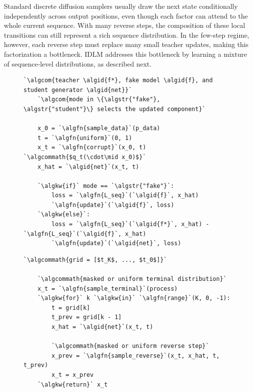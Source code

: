     Standard discrete diffusion samplers usually draw the next state
    conditionally independently across output positions, even though each
    factor can attend to the whole current sequence. With many reverse steps,
    the composition of these local transitions can still represent a rich
    sequence distribution. In the few-step regime, however, each reverse step
    must replace many small teacher updates, making this factorization a
    bottleneck.
    IDLM addresses this bottleneck by learning a mixture of sequence-level
    distributions, as described next.

\begin{figure}[!t]
\centering
\begin{minipage}[t]{0.49\linewidth}
\begin{lstlisting}[language=IDLMPseudocode, escapechar=`, basicstyle=\ttfamily\scriptsize, breaklines=true, gobble=4]
    `\algcom{teacher \algid{f*}, fake model \algid{f}, and student generator \algid{net}}`
    `\algcom{mode in \{\algstr{"fake"}, \algstr{"student"}\} selects the updated component}`

    x_0 = `\algfn{sample_data}`(p_data)
    t = `\algfn{uniform}`(0, 1)
    x_t = `\algfn{corrupt}`(x_0, t)  `\algcommath{$q_t(\cdot\mid x_0)$}`
    x_hat = `\algid{net}`(x_t, t)

    `\algkw{if}` mode == `\algstr{"fake"}`:
        loss = `\algfn{L_seq}`(`\algid{f}`, x_hat)
        `\algfn{update}`(`\algid{f}`, loss)
    `\algkw{else}`:
        loss = `\algfn{L_seq}`(`\algid{f*}`, x_hat) - `\algfn{L_seq}`(`\algid{f}`, x_hat)
        `\algfn{update}`(`\algid{net}`, loss)
    \end{lstlisting}
\idlmalgbottom
\end{minipage}\hfill
\begin{minipage}[t]{0.49\linewidth}
\begin{lstlisting}[language=IDLMPseudocode, escapechar=`, basicstyle=\ttfamily\scriptsize, breaklines=true, gobble=4]
    `\algcommath{grid = [$t_K$, ..., $t_0$]}`

    `\algcommath{masked or uniform terminal distribution}`
    x_t = `\algfn{sample_terminal}`(process)
    `\algkw{for}` k `\algkw{in}` `\algfn{range}`(K, 0, -1):
        t = grid[k]
        t_prev = grid[k - 1]
        x_hat = `\algid{net}`(x_t, t)

        `\algcommath{masked or uniform reverse step}`
        x_prev = `\algfn{sample_reverse}`(x_t, x_hat, t, t_prev)
        x_t = x_prev
    `\algkw{return}` x_t
    \end{lstlisting}
\idlmalgbottom
\end{minipage}
\vspace{-2mm}
\end{figure}

